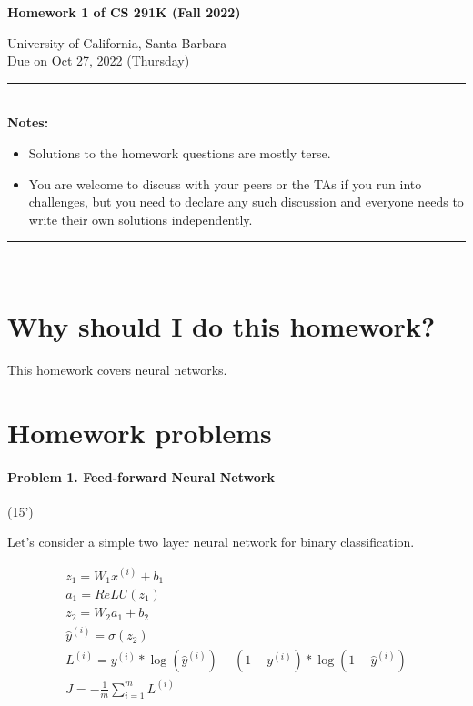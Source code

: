 \documentclass[11pt]{article}\pagestyle{plain}
\begin{document}
\begin{center}\textbf{{\LARGE Homework 1 of CS 291K (Fall 2022)}\\[.3in]}

{\large University of California, Santa Barbara}\\[.3in]
{\large Due on Oct 27, 2022 (Thursday)}\\[.1in]
\end{center}
\rule[-10pt]{16.5cm}{0.05em} \\ 
\newline
\textbf{Notes:}
\vspace{-1em}
\begin{itemize}
\item Solutions to the homework questions are mostly terse.
\item You are welcome to discuss with your peers or the TAs if you run into challenges, but you need to declare any such discussion and everyone needs to write their own solutions independently.
\end{itemize}
\vspace{-2em}
\rule[-10pt]{16.5cm}{0.05em} \\

\section{Why should I do this homework?}
This homework covers neural networks. 

\section{Homework problems}



\paragraph{Problem 1. Feed-forward Neural Network}  (15') 


Let's consider a simple two layer neural network for binary classification. 

\begin{gather*}
	z_1 = W_1x^{(i)} + b_1\\
	a_1 = ReLU(z_1)\\
	z_2 = W_2 a_1 + b_2\\
	\hat{y}^{(i)} = \sigma(z_2)\\
	L^{(i)} = y^{(i)}*\log(\hat{y}^{(i)}) + (1- y^{(i)})*\log(1 - \hat{y}^{(i)})\\
	J = -\frac{1}{m} \displaystyle \sum_{i=1}^{m}L^{(i)}\\
\end{gather*}
\end{document}
